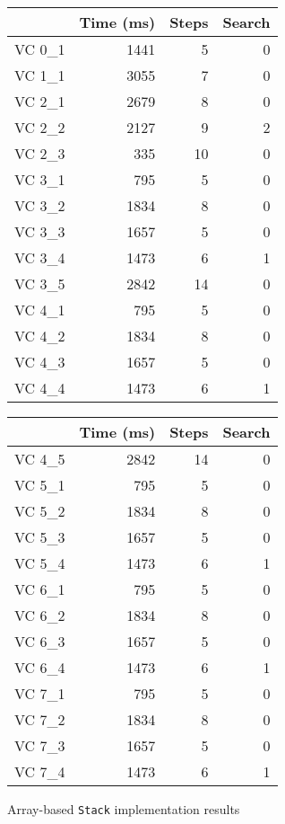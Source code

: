\begin{figure}
	\centering
	\begin{tabular}{lrrr}
		\toprule
			& Time (ms)	& Steps	& Search \\
		\midrule
		VC 0\_1	& 1441		& 5 	& 0     \\
		VC 1\_1	& 3055		& 7 	& 0     \\
		VC 2\_1	& 2679		& 8 	& 0     \\
		VC 2\_2	& 2127		& 9 	& 2     \\
		VC 2\_3	& 335		& 10	& 0     \\
		VC 3\_1	& 795 		& 5 	& 0     \\
		VC 3\_2	& 1834		& 8 	& 0     \\
		VC 3\_3	& 1657		& 5 	& 0     \\
		VC 3\_4	& 1473		& 6 	& 1     \\
		VC 3\_5	& 2842		& 14	& 0     \\
		VC 4\_1	& 795 		& 5 	& 0     \\
		VC 4\_2	& 1834		& 8 	& 0     \\
		VC 4\_3	& 1657		& 5 	& 0     \\
		VC 4\_4	& 1473		& 6 	& 1     \\
		\bottomrule
	\end{tabular}
	\qquad
	\begin{tabular}{lrrr}
		\toprule
			& Time (ms)	& Steps	& Search \\
		\midrule
		VC 4\_5	& 2842		& 14	& 0     \\
		VC 5\_1	& 795 		& 5 	& 0     \\
		VC 5\_2	& 1834		& 8 	& 0     \\
		VC 5\_3	& 1657		& 5 	& 0     \\
		VC 5\_4	& 1473		& 6 	& 1     \\
		VC 6\_1	& 795 		& 5 	& 0     \\
		VC 6\_2	& 1834		& 8 	& 0     \\
		VC 6\_3	& 1657		& 5 	& 0     \\
		VC 6\_4	& 1473		& 6 	& 1     \\
		VC 7\_1	& 795 		& 5 	& 0     \\
		VC 7\_2	& 1834		& 8 	& 0     \\
		VC 7\_3	& 1657		& 5 	& 0     \\
		VC 7\_4	& 1473		& 6 	& 1     \\
		\bottomrule
	\end{tabular}
	\caption{Array-based \texttt{Stack} implementation results\label{fig:stackResults}}
\end{figure}
